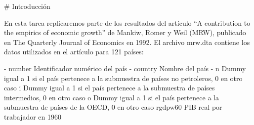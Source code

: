 # Introducción

En esta tarea replicaremos parte de los resultados del artículo “A contribution to the empirics of economic growth” de Mankiw, Romer y Weil (MRW), publicado en The Quarterly Journal of Economics en 1992. El archivo mrw.dta contiene los datos utilizados en el artículo para 121  países:

- number Identificador numérico del país
- country Nombre del país
- n
Dummy igual a 1 si el país pertenece a la submuestra de países no petroleros, 0 
en otro caso
i
Dummy igual a 1 si el país pertenece a la submuestra de países intermedios, 0 en 
otro caso
o
Dummy igual a 1 si el país pertenece a la submuestra de países de la OECD, 0 en 
otro caso
rgdpw60 PIB real por trabajador en 1960
